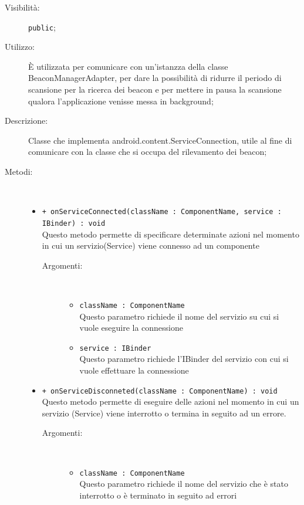 \documentclass[../DefinizioneDiProdotto.tex]{subfiles}
\begin{document}
\begin{description}
\begin{itemize}
\end{itemize}
\item[Visibilità:] \texttt{public};
\item[Utilizzo:] È utilizzata per comunicare con un'istanzza della classe BeaconManagerAdapter, per dare la possibilità di ridurre il periodo di scansione per la ricerca dei beacon e per mettere in pausa la scansione qualora l'applicazione venisse messa in background;
\item[Descrizione:] Classe che implementa android.content.ServiceConnection, utile al fine di comunicare con la classe che si occupa del rilevamento dei beacon;
\item[Metodi:] \
\begin{itemize}
\item \texttt{+ onServiceConnected(className : ComponentName, service : IBinder) : void}\\
Questo metodo permette di specificare determinate azioni nel momento in cui un servizio(Service) viene connesso ad un componente
 \begin{description}
\item[Argomenti:] \
\begin{itemize}
\item \texttt{className : ComponentName}\\
Questo parametro richiede il nome del servizio su cui si vuole eseguire la connessione\item \texttt{service : IBinder}\\
Questo parametro richiede l'IBinder del servizio con cui si vuole effettuare la connessione\end{itemize}
\end{description}
\item \texttt{+ onServiceDisconneted(className : ComponentName) : void}\\
Questo metodo permette di eseguire delle azioni nel momento in cui un servizio (Service) viene interrotto o termina in seguito ad un errore.
 \begin{description}
\item[Argomenti:] \
\begin{itemize}
\item \texttt{className : ComponentName}\\
Questo parametro richiede il nome del servizio che è stato interrotto o è terminato in seguito ad errori\end{itemize}
\end{description}
\end{itemize}
\end{description}
\end{document}
